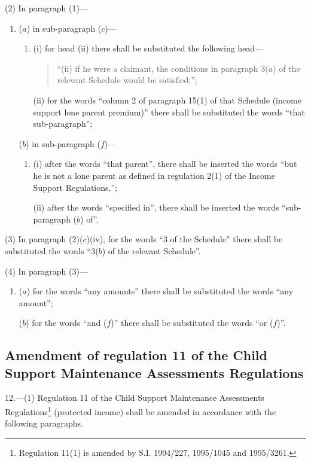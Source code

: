 \documentclass[12pt,a4paper]{article}
\begin{document}
(2) In paragraph (1)—
\begin{enumerate}\item[]
($a$) in sub-paragraph ($c$)—
\begin{enumerate}\item[]
(i) for head (ii) there shall be substituted the following head—
\begin{quotation}
“(ii) if he were a claimant, the conditions in paragraph 3($a$) of the relevant Schedule would be satisfied;”;
\end{quotation}

(ii) for the words “column 2 of paragraph 15(1) of that Schedule (income support lone parent premium)” there shall be substituted the words “that sub-paragraph”;
\end{enumerate}

($b$) in sub-paragraph ($f$)—
\begin{enumerate}\item[]
(i) after the words “that parent”, there shall be inserted the words “but he is not a lone parent as defined in regulation 2(1) of the Income Support Regulations,”;

(ii) after the words “specified in”, there shall be inserted the words “sub-paragraph ($b$) of”.
\end{enumerate}
\end{enumerate}

(3) In paragraph (2)($c$)(iv), for the words “3 of the Schedule” there shall be substituted the words “3($b$) of the relevant Schedule”.

(4) In paragraph (3)—
\begin{enumerate}\item[]
($a$) for the words “any amounts” there shall be substituted the words “any amount”;

($b$) for the words “and ($f$)” there shall be substituted the words “or ($f$)”.
\end{enumerate}

\subsection[12. Amendment of regulation 11 of the Child Support Maintenance Assessments Regulations]{\sloppy Amendment of regulation 11 of the Child Support Maintenance Assessments Regulations}

12.—(1) Regulation 11 of the Child Support Maintenance Assessments Regulations\footnote{\frenchspacing Regulation 11(1) is amended by S.I. 1994/227, 1995/1045 and 1995/3261.} (protected income) shall be amended in accordance with the following paragraphs.
\end{document}
